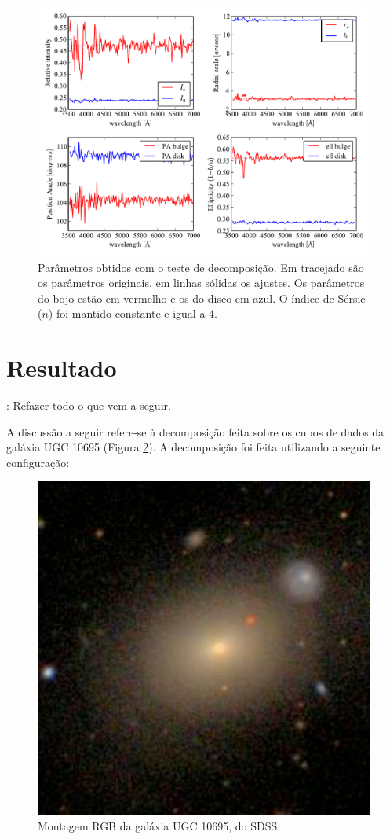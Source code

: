 \begin{figure}
	\includegraphics[width=1.0\columnwidth]{figuras/test-parameters}
	\caption[Parâmetros obtidos com o teste de decomposição] {Parâmetros obtidos
	com o teste de decomposição. Em tracejado são os parâmetros originais, em
	linhas sólidas os ajustes. Os parâmetros do bojo estão em vermelho e os do
	disco em azul. O índice de Sérsic ($n$) foi mantido constante e igual a $4$.}
	\label{fig:testParameters}
\end{figure}

\section{Resultado}

\TODO: Refazer todo o que vem a seguir.

A discussão a seguir refere-se à decomposição feita sobre os cubos de dados da
galáxia UGC 10695 (Figura \ref{fig:decompTarget}). A decomposição foi feita
utilizando a seguinte configuração:

\begin{figure}
	\includegraphics[width=0.3\columnwidth]{figuras/K0846}
	\caption[Montagem RGB da galáxia UGC 10695, do SDSS] {Montagem RGB da galáxia 
	UGC 10695, do SDSS.}
	\label{fig:decompTarget}
\end{figure}


